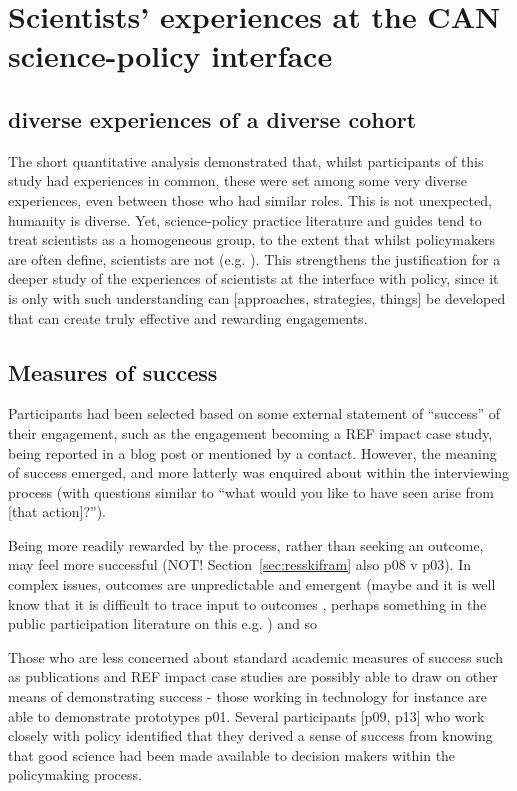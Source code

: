 \section{Scientists' experiences at the CAN science-policy interface}\label{sec:disexperience}

\subsection{diverse experiences of a diverse cohort}

The short quantitative analysis demonstrated that, whilst participants of this study had experiences in common, these were set among some very diverse experiences, even between those who had similar roles. This is not unexpected, humanity is diverse. Yet, science-policy practice literature and guides tend to treat scientists as a homogeneous group, to the extent that whilst policymakers are often define, scientists are not (e.g. \cite{BA2024trust}). This strengthens the justification for a deeper study of the experiences of scientists at the interface with policy, since it is only with such understanding can [approaches, strategies, things] be developed that can create truly effective and rewarding engagements.

\subsection{Measures of success}
Participants had been selected based on some external statement of ``success'' of their engagement, such as the engagement becoming a REF impact case study, being reported in a blog post or mentioned by a contact. However, the meaning of success emerged, and more latterly was enquired about within the interviewing process (with questions similar to ``what would you like to have seen arise from [that action]?'').

Being more readily rewarded by the process, rather than seeking an outcome, may feel more successful (NOT! Section~\ref{sec:resskifram} also p08 v p03). In complex issues, outcomes are unpredictable and emergent (maybe \cite{SnowdenB2007} and it is well know that it is difficult to trace input to outcomes \cite{BednarekSHG2015}, perhaps something in the public participation literature on this e.g. \cite{Sprain2016}) and so 

Those who are less concerned about standard academic measures of success such as publications and REF impact case studies are possibly able to draw on other means of demonstrating success - those working in technology for instance are able to demonstrate prototypes p01. Several participants [p09, p13] who work closely with policy identified that they derived a sense of success from knowing that good science had been made available to decision makers within the policymaking process.

